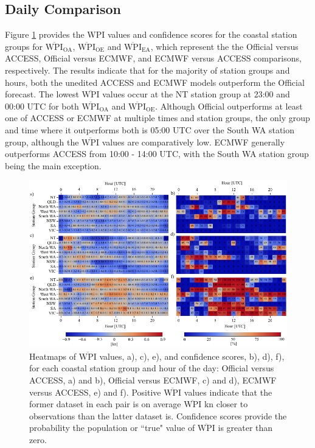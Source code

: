 \documentclass{ametsoc}
\begin{document}
\subsection{Daily Comparison}
\label{Sec:Daily}
Figure \ref{Fig:wpi_coastal} provides the WPI values and confidence scores for the coastal station groups for $\overline{\text{WPI}}_\text{OA}$, $\overline{\text{WPI}}_\text{OE}$ and $\overline{\text{WPI}}_\text{EA}$, which represent the the Official versus ACCESS, Official versus ECMWF, and ECMWF versus ACCESS comparisons, respectively. The results indicate that for the majority of station groups and hours, both the unedited ACCESS and ECMWF models outperform the Official forecast. The lowest $\overline{\text{WPI}}$ values occur at the NT station group at 23:00 and 00:00 UTC for both $\overline{\text{WPI}}_\text{OA}$ and $\overline{\text{WPI}}_\text{OE}$. Although Official outperforms at least one of ACCESS or ECMWF at multiple times and station groups, the only group and time where it outperforms both is 05:00 UTC over the South WA station group, although the $\overline{\text{WPI}}$ values are comparatively low. ECMWF generally outperforms ACCESS from 10:00 - 14:00 UTC, with the South WA station group being the main exception.    

\begin{figure}
\centering
\includegraphics[width=39pc]{wpi_coastal.pdf}
\caption{Heatmaps of $\overline{\text{WPI}}$ values, a), c), e), and confidence scores, b), d), f), for each coastal station group and hour of the day: Official versus ACCESS, a) and b), Official versus ECMWF, c) and d), ECMWF versus ACCESS, e) and f). Positive $\overline{\text{WPI}}$ values indicate that the former dataset in each pair is on average $\overline{\text{WPI}}$ kn closer to observations than the latter dataset is. Confidence scores provide the probability the population or ``true" value of $\overline{\text{WPI}}$ is greater than zero.}
\label{Fig:wpi_coastal}
\end{figure}
\end{document}

